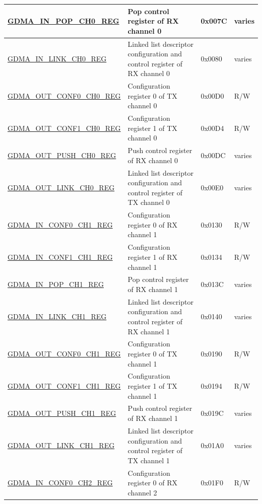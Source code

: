 \begin{longtable}{ | p{6.7cm} | p{6cm} | p{1.3cm} | p{1.5cm} | }
\hyperref[regdesc:GDMAINPOPCHNREG]{GDMA\_IN\_POP\_CH0\_REG} & Pop control register of RX channel 0 & 0x007C & varies \\ \hline
\hyperref[regdesc:GDMAINLINKCHNREG]{GDMA\_IN\_LINK\_CH0\_REG} & Linked list descriptor configuration and control register of RX channel 0 & 0x0080 & varies \\ \hline
\hyperref[regdesc:GDMAOUTCONF0CHNREG]{GDMA\_OUT\_CONF0\_CH0\_REG} & Configuration register 0 of TX channel 0 & 0x00D0 & R/W \\ \hline
\hyperref[regdesc:GDMAOUTCONF1CHNREG]{GDMA\_OUT\_CONF1\_CH0\_REG} & Configuration register 1 of TX channel 0 & 0x00D4 & R/W \\ \hline
\hyperref[regdesc:GDMAOUTPUSHCHNREG]{GDMA\_OUT\_PUSH\_CH0\_REG} & Push control register of RX channel 0 & 0x00DC & varies \\ \hline
\hyperref[regdesc:GDMAOUTLINKCHNREG]{GDMA\_OUT\_LINK\_CH0\_REG} & Linked list descriptor configuration and control register of TX channel 0 & 0x00E0 & varies \\ \hline
\hyperref[regdesc:GDMAINCONF0CHNREG]{GDMA\_IN\_CONF0\_CH1\_REG} & Configuration register 0 of RX channel 1 & 0x0130 & R/W \\ \hline
\hyperref[regdesc:GDMAINCONF1CHNREG]{GDMA\_IN\_CONF1\_CH1\_REG} & Configuration register 1 of RX channel 1 & 0x0134 & R/W \\ \hline
\hyperref[regdesc:GDMAINPOPCHNREG]{GDMA\_IN\_POP\_CH1\_REG} & Pop control register of RX channel 1 & 0x013C & varies \\ \hline
\hyperref[regdesc:GDMAINLINKCHNREG]{GDMA\_IN\_LINK\_CH1\_REG} & Linked list descriptor configuration and control register of RX channel 1 & 0x0140 & varies \\ \hline
\hyperref[regdesc:GDMAOUTCONF0CHNREG]{GDMA\_OUT\_CONF0\_CH1\_REG} & Configuration register 0 of TX channel 1 & 0x0190 & R/W \\ \hline
\hyperref[regdesc:GDMAOUTCONF1CHNREG]{GDMA\_OUT\_CONF1\_CH1\_REG} & Configuration register 1 of TX channel 1 & 0x0194 & R/W \\ \hline
\hyperref[regdesc:GDMAOUTPUSHCHNREG]{GDMA\_OUT\_PUSH\_CH1\_REG} & Push control register of RX channel 1 & 0x019C & varies \\ \hline
\hyperref[regdesc:GDMAOUTLINKCHNREG]{GDMA\_OUT\_LINK\_CH1\_REG} & Linked list descriptor configuration and control register of TX channel 1 & 0x01A0 & varies \\ \hline
\hyperref[regdesc:GDMAINCONF0CHNREG]{GDMA\_IN\_CONF0\_CH2\_REG} & Configuration register 0 of RX channel 2 & 0x01F0 & R/W \\ \hline

\end{longtable}
